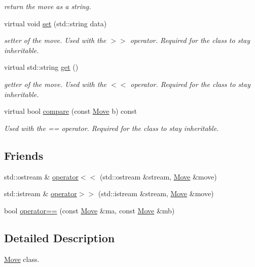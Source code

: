\begin{DoxyCompactItemize}
\begin{DoxyCompactList}\small\item\em return the move as a string. \end{DoxyCompactList}\item 
virtual void \hyperlink{class_move_a46945736ced7263e3442fe3228350f30}{set} (std\+::string data)
\begin{DoxyCompactList}\small\item\em setter of the move. Used with the $>$$>$ operator. Required for the class to stay inheritable. \end{DoxyCompactList}\item 
virtual std\+::string \hyperlink{class_move_aa4617db45db61e6413742b65fa757de9}{get} ()
\begin{DoxyCompactList}\small\item\em getter of the move. Used with the $<$$<$ operator. Required for the class to stay inheritable. \end{DoxyCompactList}\item 
virtual bool \hyperlink{class_move_a19807b37b57bee9b8b04d33f203f29a8}{compare} (const \hyperlink{class_move}{Move} b) const 
\begin{DoxyCompactList}\small\item\em Used with the == operator. Required for the class to stay inheritable. \end{DoxyCompactList}\end{DoxyCompactItemize}
\subsection*{Friends}
\begin{DoxyCompactItemize}
\item 
std\+::ostream \& \hyperlink{class_move_afc4efde5b88313f84366cd3270dc7292}{operator$<$$<$} (std\+::ostream \&stream, \hyperlink{class_move}{Move} \&move)
\item 
std\+::istream \& \hyperlink{class_move_ab3b1f133ca76ffc4c3f85afeeb4cb632}{operator$>$$>$} (std\+::istream \&stream, \hyperlink{class_move}{Move} \&move)
\item 
bool \hyperlink{class_move_ac7711545a479e15b417fb11dad5be07e}{operator==} (const \hyperlink{class_move}{Move} \&ma, const \hyperlink{class_move}{Move} \&mb)
\end{DoxyCompactItemize}


\subsection{Detailed Description}
\hyperlink{class_move}{Move} class. 

